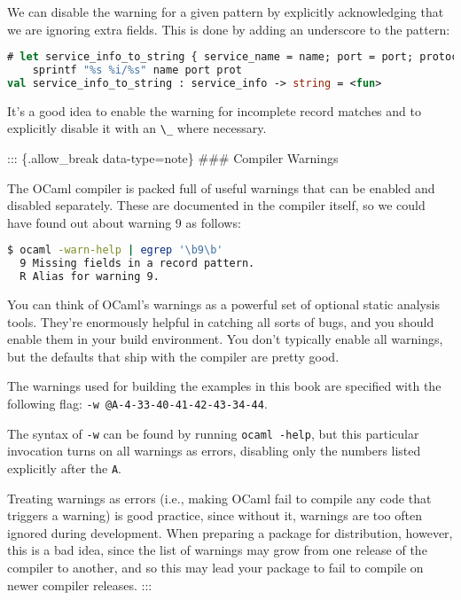 We can disable the warning for a given pattern by explicitly
acknowledging that we are ignoring extra fields. This is done by adding
an underscore to the pattern:

\begin{lstlisting}[language=Caml]
# let service_info_to_string { service_name = name; port = port; protocol = prot; _ } =
    sprintf "%s %i/%s" name port prot
val service_info_to_string : service_info -> string = <fun>
\end{lstlisting}

It's a good idea to enable the warning for incomplete record matches and
to explicitly disable it with an \passthrough{\lstinline!\_!} where
necessary.

::: \{.allow\_break data-type=note\} \#\#\# Compiler Warnings

The OCaml compiler is packed full of useful warnings that can be enabled
and disabled separately. These are documented in the compiler itself, so
we could have found out about warning 9 as follows:

\begin{lstlisting}[language=bash]
$ ocaml -warn-help | egrep '\b9\b'
  9 Missing fields in a record pattern.
  R Alias for warning 9.
\end{lstlisting}

You can think of OCaml's warnings as a powerful set of optional static
analysis tools. They're enormously helpful in catching all sorts of
bugs, and you should enable them in your build environment. You don't
typically enable all warnings, but the defaults that ship with the
compiler are pretty good.

The warnings used for building the examples in this book are specified
with the following flag:
\passthrough{\lstinline!-w @A-4-33-40-41-42-43-34-44!}.

The syntax of \passthrough{\lstinline!-w!} can be found by running
\passthrough{\lstinline!ocaml -help!}, but this particular invocation
turns on all warnings as errors, disabling only the numbers listed
explicitly after the \passthrough{\lstinline!A!}.

Treating warnings as errors (i.e., making OCaml fail to compile any code
that triggers a warning) is good practice, since without it, warnings
are too often ignored during development. When preparing a package for
distribution, however, this is a bad idea, since the list of warnings
may grow from one release of the compiler to another, and so this may
lead your package to fail to compile on newer compiler releases. :::

